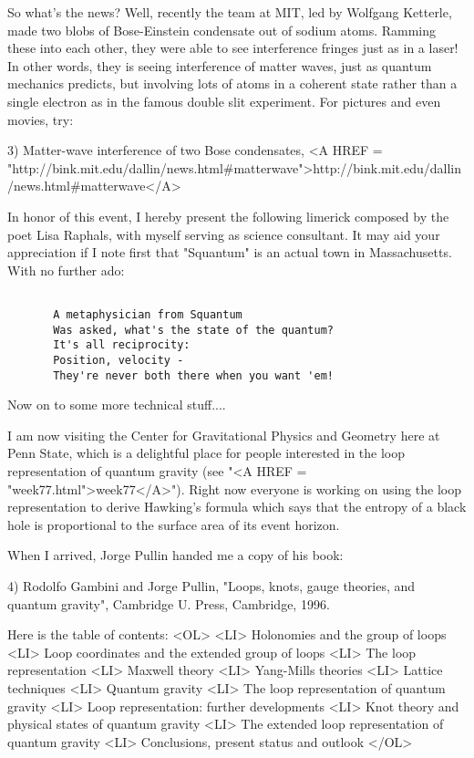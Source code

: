So what's the news?  Well, recently the team at MIT, led by Wolfgang
Ketterle, made two blobs of Bose-Einstein condensate out of sodium
atoms.  Ramming these into each other, they were able to see
interference fringes just as in a laser!  In other words, they is
seeing interference of matter waves, just as quantum mechanics
predicts, but involving lots of atoms in a coherent state rather than
a single electron as in the famous double slit experiment.  For
pictures and even movies, try:

3) Matter-wave interference of two Bose condensates,
<A HREF = "http://bink.mit.edu/dallin/news.html#matterwave">http://bink.mit.edu/dallin/news.html#matterwave</A>

In honor of this event, I hereby present the following limerick
composed by the poet Lisa Raphals, with myself serving as science
consultant.  It may aid your appreciation if I note first that
"Squantum" is an actual town in Massachusetts.  With no further ado:


\begin{verbatim}

       A metaphysician from Squantum
       Was asked, what's the state of the quantum?
       It's all reciprocity:
       Position, velocity -
       They're never both there when you want 'em!

\end{verbatim}
    
Now on to some more technical stuff....

I am now visiting the Center for Gravitational Physics and Geometry
here at Penn State, which is a delightful place for people interested
in the loop representation of quantum gravity (see "<A HREF = "week77.html">week77</A>").  Right
now everyone is working on using the loop representation to derive
Hawking's formula which says that the entropy of a black hole is
proportional to the surface area of its event horizon.  

When I arrived, Jorge Pullin handed me a copy of his book:

4) Rodolfo Gambini and Jorge Pullin, "Loops, knots, gauge theories,
and quantum gravity", Cambridge U. Press, Cambridge, 1996.

Here is the table of contents:
<OL>
<LI> Holonomies and the group of loops
<LI> Loop coordinates and the extended group of loops
<LI> The loop representation
<LI> Maxwell theory
<LI> Yang-Mills theories
<LI> Lattice techniques
<LI> Quantum gravity
<LI> The loop representation of quantum gravity
<LI> Loop representation: further developments
<LI> Knot theory and physical states of quantum gravity
<LI> The extended loop representation of quantum gravity
<LI> Conclusions, present status and outlook
</OL>

